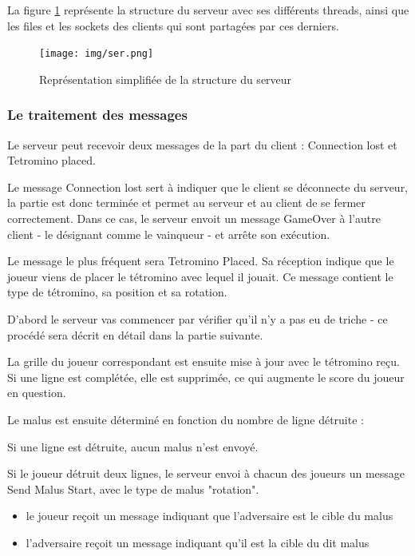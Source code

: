 \documentclass[a4paper, 12pt]{article}
\begin{document}
		La figure \ref{fig:ser} représente la structure du serveur avec ses différents threads, ainsi que les files et les sockets des clients qui sont partagées par ces derniers.

		\begin{figure}[bt]
			\centering
			\texttt{[image: img/ser.png]}
			\caption{Représentation simplifiée de la structure du serveur}
			\label{fig:ser}
		\end{figure}

		\subsubsection{Le traitement des messages}
			Le serveur peut recevoir deux messages de la part du client : Connection lost et Tetromino placed.

			Le message Connection lost sert à indiquer que le client se déconnecte du serveur, la partie est donc terminée et permet au serveur et au client de se fermer correctement. Dans ce cas, le serveur envoit un message GameOver à l'autre client - le désignant comme le vainqueur - et arrête son exécution.

 
			Le message le plus fréquent sera Tetromino Placed. Sa réception indique que le joueur viens de placer le tétromino avec lequel il jouait. Ce message contient le type de tétromino, sa position et sa rotation. 

			D'abord le serveur vas commencer par vérifier qu'il n'y a pas eu de triche - ce procédé sera décrit en détail dans la partie suivante. 


			La grille du joueur correspondant est ensuite mise à jour avec le tétromino reçu.
			Si une ligne est complétée, elle est supprimée, ce qui augmente le score du joueur en question.


			Le malus est ensuite déterminé en fonction du nombre de ligne détruite :

			Si une ligne est détruite, aucun malus n'est envoyé.

			Si le joueur détruit deux lignes, le serveur envoi à chacun des joueurs un message Send Malus Start, avec le type de malus "rotation".

			\begin{itemize}
				\item le joueur reçoit un message indiquant que l'adversaire est le cible du malus
				\item l'adversaire reçoit un message indiquant qu'il est la cible du dit malus
			\end{itemize}
\end{document}

